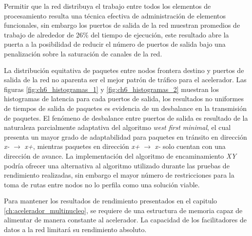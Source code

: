 Permitir que la red distribuya el trabajo entre todos los elementos de procesamiento resulta una técnica efectiva de administración de elementos funcionales, sin embargo los puertos de salida de la red muestran promedios de trabajo de alrededor de 26\% del tiempo de ejecución, este resultado abre la puerta a la posibilidad de reducir el número de puertos de salida bajo una penalización sobre la saturación de canales de la red.  

La distribución equitativa de paquetes entre nodos frontera destino y puertos de salida de la red no aparenta ser el mejor patrón de tráfico para el acelerador. Las figuras \ref{fig:ch6_histogramas_1} y \ref{fig:ch6_histogramas_2} muestran los histogramas de latencia para cada puertos de salida, los resultados no uniformes de tiempos de salida de paquetes es evidencia de un desbalance en la transmisión de paquetes. El fenómeno de desbalance entre puertos de salida es resultado de la naturaleza parcialmente adaptativa del algoritmo \textit{west first minimal}, el cual presenta un mayor grado de adaptabilidad para paquetes en tránsito en dirección \textit{x-} $\longrightarrow$ \textit{x+}, mientras paquetes en dirección \textit{x+} $\longrightarrow$ \textit{x-} solo cuentan con una dirección de avance. La implementación del algoritmo de encaminamiento \textit{XY} podría ofrecer una alternativa al algoritmo utilizado durante las pruebas de rendimiento realizadas, sin embargo el mayor número de restricciones para la toma de rutas entre nodos no lo perfila como una solución viable.

Para mantener los resultados de rendimiento presentados en el capitulo \ref{ch:acelerador_multinucleo}, se requiere de una estructura de memoria capaz de alimentar de manera constante al acelerador. La capacidad de los facilitadores de datos a la red limitará su rendimiento absoluto.

